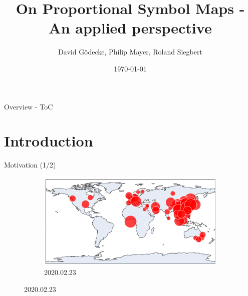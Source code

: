 \documentclass{beamer}
\title{On Proportional Symbol Maps - An applied perspective}
\date{\today}
\author{David Gödecke, Philip Mayer, Roland Siegbert}
\institute{Geometry Lab SS 2020}
\begin{document}
\maketitle

\begin{frame}{Overview - ToC}
  \tableofcontents
\end{frame}

\section{Introduction}

\begin{frame}{Motivation (1/2)}

  \begin{figure}[!b]
    \centering
    \begin{subfigure}[b]{\linewidth}
      \centering
      \includegraphics[width=0.9\linewidth]{../covid_spread_20200223.png}
      \caption{2020.02.23}
    \end{subfigure}
  \end{figure}

\end{frame}
\end{document}

